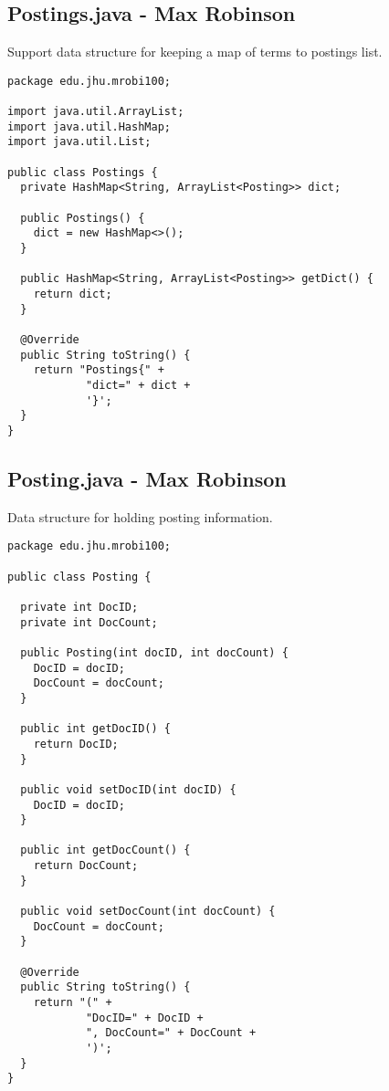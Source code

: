 \documentclass{article}
\begin{document}
\subsection{Postings.java - Max Robinson}
Support data structure for keeping a map of terms to postings list.
\begin{verbatim}
package edu.jhu.mrobi100;

import java.util.ArrayList;
import java.util.HashMap;
import java.util.List;

public class Postings {
  private HashMap<String, ArrayList<Posting>> dict;

  public Postings() {
    dict = new HashMap<>();
  }

  public HashMap<String, ArrayList<Posting>> getDict() {
    return dict;
  }

  @Override
  public String toString() {
    return "Postings{" +
            "dict=" + dict +
            '}';
  }
}
\end{verbatim}

\subsection{Posting.java - Max Robinson}
Data structure for holding posting information. 
\begin{verbatim}
package edu.jhu.mrobi100;

public class Posting {

  private int DocID;
  private int DocCount;

  public Posting(int docID, int docCount) {
    DocID = docID;
    DocCount = docCount;
  }

  public int getDocID() {
    return DocID;
  }

  public void setDocID(int docID) {
    DocID = docID;
  }

  public int getDocCount() {
    return DocCount;
  }

  public void setDocCount(int docCount) {
    DocCount = docCount;
  }

  @Override
  public String toString() {
    return "(" +
            "DocID=" + DocID +
            ", DocCount=" + DocCount +
            ')';
  }
}
\end{verbatim}
\end{document}
